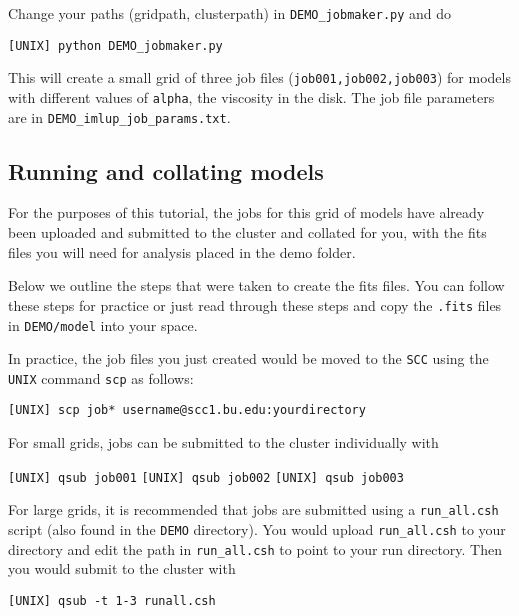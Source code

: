 \documentclass{article}
\begin{document}
Change your paths (gridpath, clusterpath) in \texttt{DEMO\_jobmaker.py} and do

\vspace{2mm}
\texttt{[UNIX] python DEMO\_jobmaker.py}
\vspace{2mm}

This will create a small grid of three job files (\texttt{job001,job002,job003}) for models with different values of \texttt{alpha}, the viscosity in the disk.  The job file parameters are in \texttt{DEMO\_imlup\_job\_params.txt}.

\subsection{Running and collating models}

For the purposes of this tutorial, the jobs for this grid of models have already been uploaded and submitted to the cluster and collated for you, with the fits files you will need for analysis placed in the demo folder. 

Below we outline the steps that were taken to create the fits files.  You can follow these steps for practice or just read through these steps and copy the \texttt{.fits} files in \texttt{DEMO/model} into your space. 

In practice, the job files you just created would be moved to the \texttt{SCC} using the \texttt{UNIX} command \texttt{scp} as follows: 

\vspace{2mm}
\texttt{[UNIX] scp job* username@scc1.bu.edu:yourdirectory}
\vspace{2mm}

For small grids, jobs can be submitted to the cluster individually with

\vspace{2mm}
\texttt{[UNIX] qsub job001}
\texttt{[UNIX] qsub job002}
\texttt{[UNIX] qsub job003}
\vspace{2mm}

For large grids, it is recommended that jobs are submitted using a \texttt{run\_all.csh} script (also found in the \texttt{DEMO} directory).  You would upload \texttt{run\_all.csh} to your directory and edit the path in \texttt{run\_all.csh} to point to your run directory.  Then you would submit to the cluster with

\vspace{2mm}
\texttt{[UNIX] qsub -t 1-3 runall.csh}
\vspace{2mm}
\end{document}

